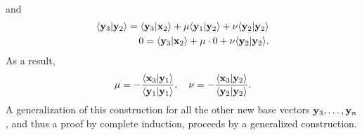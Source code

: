 {\begin{equation}
\begin{split}
\end{split}
\end{equation}
and
\begin{equation}
\begin{split}
\langle {\bf y}_3\vert {\bf y}_2\rangle =\langle {\bf y}_3\vert {\bf x}_2 \rangle + \mu  \langle {\bf y}_1\vert {\bf y}_2 \rangle  + \nu  \langle {\bf y}_2\vert {\bf y}_2\rangle
\\
0 =\langle {\bf y}_3\vert {\bf x}_2 \rangle + \mu   \cdot 0  + \nu  \langle {\bf y}_2\vert {\bf y}_2 \rangle  .
\end{split}
\end{equation}
As a result,
\begin{equation}
\mu = -  \frac{\langle {\bf x}_3\vert {\bf y}_1  \rangle}
{\langle {\bf y}_1\vert {\bf y}_1 \rangle},\quad
\nu =- \frac{\langle {\bf x}_3\vert {\bf y}_2  \rangle}
{\langle {\bf y}_2\vert {\bf y}_2 \rangle}.
\end{equation}
A generalization of this construction
for all the other new base vectors
${\bf y}_3, \ldots ,  {\bf y}_n$, and thus a proof by complete induction,
proceeds by a generalized construction.
\eproof
}

